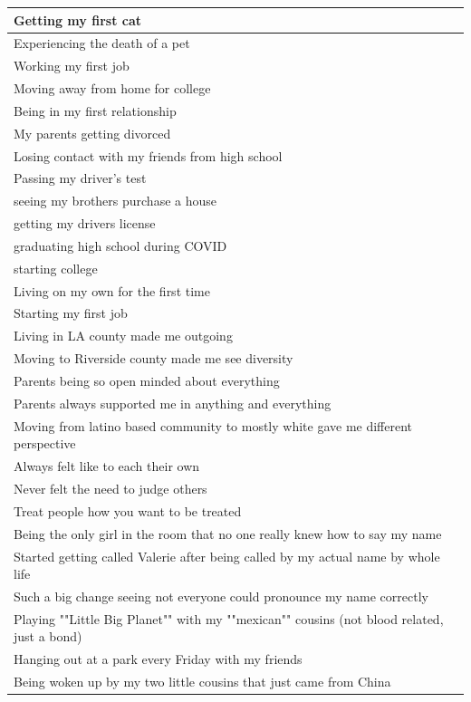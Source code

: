 \documentclass[
  .7em,
  letterpaper,
  DIV=11,
  numbers=noendperiod]{scrartcl}
\begin{document}
\begin{table}
\begin{tabular}{l}
\hline
Getting my first cat\\
\hline
Experiencing the death of a pet\\
\hline
Working my first job\\
\hline
Moving away from home for college\\
\hline
Being in my first relationship\\
\hline
My parents getting divorced\\
\hline
Losing contact with my friends from high school\\
\hline
Passing my driver's test\\
\hline
seeing my brothers purchase a house\\
\hline
getting my drivers license\\
\hline
graduating high school during COVID\\
\hline
starting college\\
\hline
Living on my own for the first time\\
\hline
Starting my first job\\
\hline
Living in LA county made me outgoing\\
\hline
Moving to Riverside county made me see diversity\\
\hline
Parents being so open minded about everything\\
\hline
Parents always supported me in anything and everything\\
\hline
Moving from latino based community to mostly white gave me different perspective\\
\hline
Always felt like to each their own\\
\hline
Never felt the need to judge others\\
\hline
Treat people how you want to be treated\\
\hline
Being the only girl in the room that no one really knew how to say my name\\
\hline
Started getting called Valerie after being called by my actual name by whole life\\
\hline
Such a big change seeing not everyone could pronounce my name correctly\\
\hline
Playing ""Little Big Planet"" with my ""mexican"" cousins (not blood related, just a bond)\\
\hline
Hanging out at a park every Friday with my friends\\
\hline
Being woken up by my two little cousins that just came from China\\

\end{tabular}
\end{table}
\end{document}
